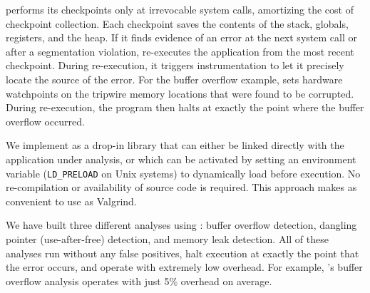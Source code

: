 \doubletake{} performs its checkpoints only at
irrevocable system calls, amortizing the cost of checkpoint
collection. Each checkpoint saves the contents of the stack,
globals, registers, and the heap. If it finds evidence of an error at
the next system call or after a segmentation violation, \doubletake{}
re-executes the application from the most recent checkpoint. During
re-execution, it triggers instrumentation to let it precisely locate
the source of the error. For the buffer overflow
example, \doubletake{} sets hardware watchpoints on the tripwire
memory locations that were found to be corrupted. During re-execution,
the program then halts at exactly the point where the buffer overflow
occurred.

We implement \doubletake{} as a drop-in library that can either be
linked directly with the application under analysis, or which can be
activated by setting an environment variable (\texttt{LD\_PRELOAD} on
Unix systems) to dynamically load \doubletake{} before execution. No
re-compilation or availability of source code is required. This
approach makes \doubletake{} as convenient to use as Valgrind.

We have built three different analyses using \doubletake{}: buffer
overflow detection, dangling pointer (use-after-free) detection, and
memory leak detection. All of these analyses run without any false
positives, halt execution at exactly the point that the error occurs,
and operate with extremely low overhead. For example, \doubletake{}'s
buffer overflow analysis operates with just 5\% overhead on average.

